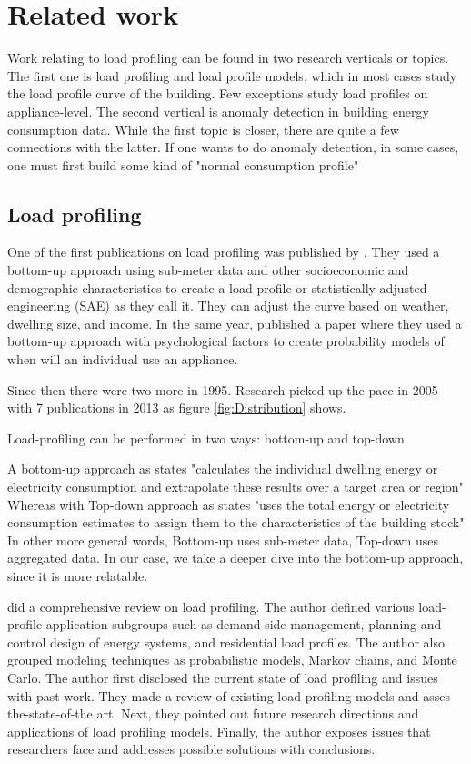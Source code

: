 \chapter{Related work}
\label{chapter3}

Work relating to load profiling can be found in two research verticals or topics. The first one is load profiling and load profile models, which in 
most cases study the load profile curve of the building. Few exceptions study load profiles on appliance-level.
The second vertical is anomaly detection in building energy consumption data. While the first topic is closer, there are quite a few connections with the latter. 
If one wants to do anomaly detection, in some cases, one must first build some kind of "normal consumption profile" 

\section{Load profiling}

One of the first publications on load profiling was published by \cite{TRAIN19851103}.
They used a bottom-up approach using sub-meter data and other socioeconomic and demographic characteristics 
to create a load profile or statistically adjusted engineering (SAE) as they call it.
They can adjust the curve based on weather, dwelling size, and income. 
In the same year, \cite{WALKER1985} published a paper where they used a bottom-up approach with psychological factors to create probability models of when will an individual use an appliance.

Since then there were two more in 1995. Research picked up the pace in 2005 with 7 publications in 2013 as figure \ref{fig:Distribution} shows.

Load-profiling can be performed in two ways: bottom-up and top-down. 

A bottom-up approach as \cite{SWAN20091819} states "calculates the individual dwelling energy or electricity consumption and extrapolate these results over a target area or region"
Whereas with Top-down approach as \cite{SWAN20091819} states "uses the total energy or electricity consumption estimates to assign them to the characteristics of the building stock"
In other more general words, Bottom-up uses sub-meter data, Top-down uses aggregated data. In our case, we take a deeper dive into the bottom-up approach, since it is more relatable.

\cite{Review2021} did a comprehensive review on load profiling. The author defined various load-profile application
subgroups such as demand-side management, planning and control design of energy systems, and residential load profiles. The author also 
grouped modeling techniques as probabilistic models, Markov chains, and Monte Carlo. The author first disclosed the current state of load profiling and issues with past work.
They made a review of existing load profiling models
and asses the-state-of-the art. 
Next, they pointed out future research directions
and applications of load profiling models. Finally, the author exposes issues that researchers face and addresses possible solutions with conclusions.

